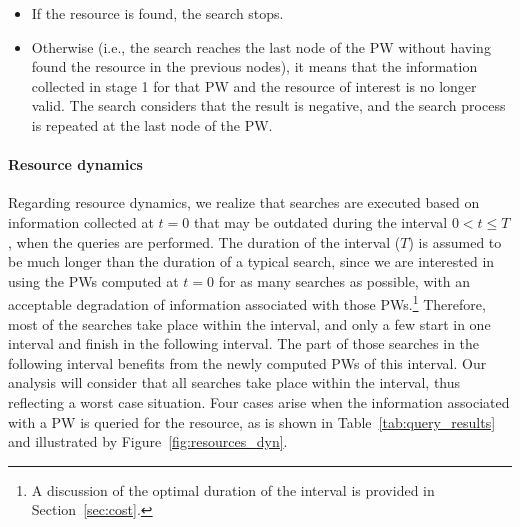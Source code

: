 \documentclass[]{elsarticle}
\begin{document}
\begin{enumerate}
\begin{itemize}
\begin{itemize}
\item
If the resource is found, the search stops. 

\item
Otherwise (i.e., the search reaches the last node of the PW without having found the resource in the previous nodes), it means that the information collected in stage 1 for that PW and the resource of interest is no longer valid. The search considers that the result is negative, and the search process is repeated at the last node of the PW.

\end{itemize}

\end{itemize}

\end{enumerate}

\paragraph{Resource dynamics} Regarding resource dynamics, we realize that searches are executed based on information collected at $t\!=\!0$ that may be outdated during the interval $0 < t \leq T$, when the queries are performed. 
The duration of the interval ($T$) is assumed to be much longer than the duration of a typical search, since we are interested in using the PWs computed at $t=0$ for as many searches as possible, with an acceptable degradation of information associated with those PWs.\footnote{A discussion of the optimal duration of the interval is provided in Section~\ref{sec:cost}.} Therefore, most of the searches take place within the interval, and only a few start in one interval and finish in the following interval. The part of those searches in the following interval benefits from the newly computed PWs of this interval. Our analysis will consider that all searches take place within the interval, thus reflecting a worst case situation.  
Four cases arise when the information associated with a PW is queried for the resource, as is shown in Table~\ref{tab:query_results} and illustrated by Figure~\ref{fig:resources_dyn}. 
\end{document}
